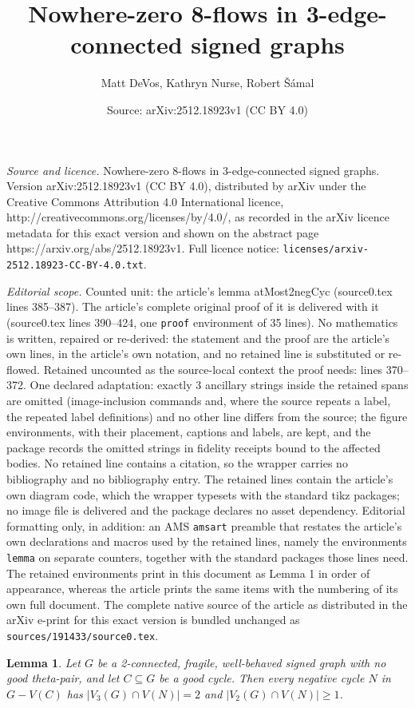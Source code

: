 \documentclass[10pt,a4paper]{amsart}
\title{Nowhere-zero 8-flows in 3-edge-connected signed graphs}
\author{Matt DeVos, Kathryn Nurse, Robert \v{S}\'amal}
\date{Source: arXiv:2512.18923v1 (CC BY 4.0)}
\newtheorem{lemma}{Lemma}
\begin{document}
\maketitle

\noindent\emph{Source and licence.} Nowhere-zero 8-flows in 3-edge-connected signed graphs. Version arXiv:2512.18923v1 (CC BY 4.0), distributed by arXiv under the Creative Commons Attribution 4.0 International licence, http://creativecommons.org/licenses/by/4.0/, as recorded in the arXiv licence metadata for this exact version and shown on the abstract page https://arxiv.org/abs/2512.18923v1. Full licence notice: \texttt{licenses/arxiv-2512.18923-CC-BY-4.0.txt}.\par\smallskip

\noindent\textit{Editorial scope.} Counted unit: the article's lemma atMost2negCyc (source0.tex lines 385--387). The article's complete original proof of it is delivered with it (source0.tex lines 390--424, one \texttt{proof} environment of 35 lines). No mathematics is written, repaired or re-derived: the statement and the proof are the article's own lines, in the article's own notation, and no retained line is substituted or re-flowed.  Retained uncounted as the source-local context the proof needs: lines 370--372.  One declared adaptation: exactly 3 ancillary strings inside the retained spans are omitted (image-inclusion commands and, where the source repeats a label, the repeated label definitions) and no other line differs from the source; the figure environments, with their placement, captions and labels, are kept, and the package records the omitted strings in fidelity receipts bound to the affected bodies.  No retained line contains a citation, so the wrapper carries no bibliography and no bibliography entry.  The retained lines contain the article's own diagram code, which the wrapper typesets with the standard tikz packages; no image file is delivered and the package declares no asset dependency.  Editorial formatting only, in addition: an AMS \texttt{amsart} preamble that restates the article's own declarations and macros used by the retained lines, namely the environments \texttt{lemma} on separate counters, together with the standard packages those lines need.  The retained environments print in this document as Lemma 1 in order of appearance, whereas the article prints the same items with the numbering of its own full document.  The complete native source of the article as distributed in the arXiv e-print for this exact version is bundled unchanged as \texttt{sources/191433/source0.tex}.
\begin{lemma}\label{fragileNegCyc}
    Let $G$ be a 2-connected, fragile, well-behaved signed graph with no good theta-pair, and let $C \subseteq G$ be a good cycle. Then every negative cycle $N$ in $G - V(C)$ has $|V_3(G) \cap V(N)| = 2$ and $|V_2(G) \cap V(N)| \ge 1$. 
\end{lemma}
\end{document}
